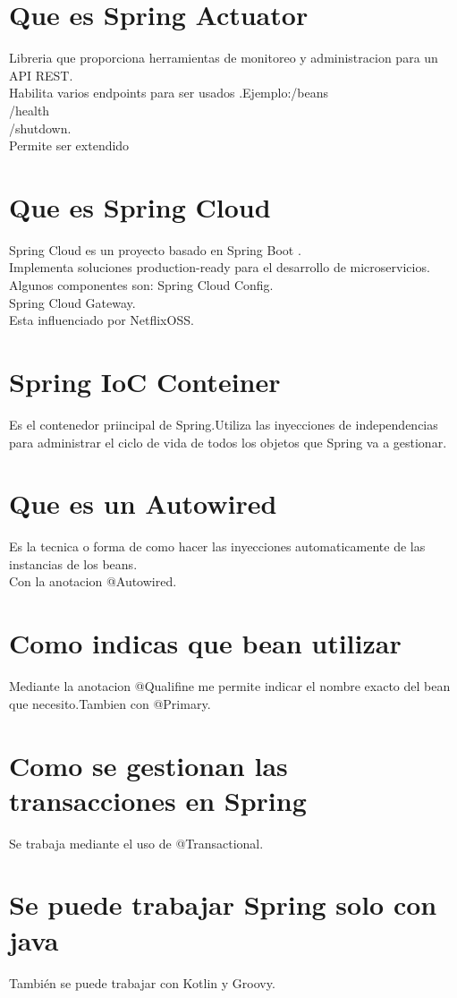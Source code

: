 \section{Que es Spring Actuator}
Libreria que proporciona herramientas de monitoreo y administracion para un API REST.\\
Habilita varios endpoints para ser usados .Ejemplo:/beans\\/health\\/shutdown.\\
Permite ser extendido
\section{Que es Spring Cloud}
Spring Cloud es un proyecto basado en Spring Boot .\\
Implementa soluciones production-ready para el desarrollo de microservicios.\\
Algunos componentes son: Spring	Cloud Config.\\
Spring Cloud Gateway.\\
Esta influenciado por NetflixOSS.
\section{Spring IoC Conteiner}
Es el contenedor priincipal de Spring.Utiliza las inyecciones de independencias para administrar
el ciclo de vida de todos los objetos que Spring va a gestionar.
\section{Que es un Autowired}
Es la tecnica o forma de como hacer las inyecciones automaticamente de las instancias de los beans.\\
Con la anotacion @Autowired.
\section{Como indicas que bean utilizar}
Mediante la anotacion @Qualifine me permite indicar el nombre exacto del bean que necesito.Tambien con
@Primary.
\section{Como se gestionan las transacciones en Spring}
Se trabaja mediante el uso de @Transactional.
\section{Se puede trabajar Spring solo con java}
Tambi\'en se puede trabajar con Kotlin y Groovy.
